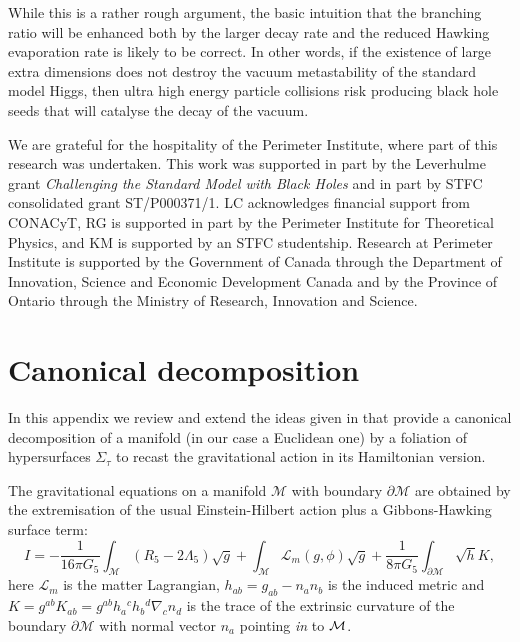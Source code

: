 \documentclass[aps,12pt,prd,superscriptaddress,preprintnumbers, 
	amssymb,
	amsmath,
	notitlepage,
	longbibliography,
	nofootinbib]{revtex4-1}
\begin{document}
While this is a rather rough argument, the basic intuition that the 
branching ratio will be enhanced both by the larger decay rate and 
the reduced Hawking evaporation rate is likely to be correct. In other
words, if the existence of large extra dimensions does not destroy the 
vacuum metastability of the standard model Higgs, then ultra high energy
particle collisions risk producing black hole seeds that will catalyse the
decay of the vacuum.


\acknowledgments

We are grateful for the hospitality of the Perimeter Institute, where part
of this research was undertaken. This work was supported in part by the 
Leverhulme grant \emph{Challenging the Standard Model with Black Holes}
and in part by STFC consolidated grant ST/P000371/1.  
LC acknowledges financial support from CONACyT,
RG is supported in part by the Perimeter Institute for Theoretical Physics,
and KM is supported by an STFC studentship.
Research at Perimeter Institute is supported by the Government of
Canada through the Department of Innovation, Science and Economic 
Development Canada and by the Province of Ontario through the
Ministry of Research, Innovation and Science.




\appendix
\section{Canonical decomposition}
\label{Appaction}

In this appendix we review and extend the ideas given in \cite{Hawking:1995fd}
that provide a canonical decomposition of a manifold (in our case a
Euclidean one) by a foliation of hypersurfaces $\Sigma_\tau$ to recast 
the gravitational action in its Hamiltonian version. 

The gravitational equations on a manifold $\mathcal{M}$ with boundary 
$\partial \mathcal{M}$ are obtained by the extremisation of the usual 
Einstein-Hilbert action plus a Gibbons-Hawking surface term:
\begin{equation}
I= - \frac{1}{16\pi G_5} \int_{\mathcal{M}}\left(R_5 - 2\Lambda_5\right)  
\sqrt{g} + \int_{\mathcal{M}} \mathcal{L}_m(g,\phi)  \sqrt{g} 
+ \frac{1}{8\pi G_5} \int_{\partial\mathcal{M} }\sqrt{h}  K,
\label{TBHaction}
\end{equation}
here $\mathcal{L}_m$ is the matter Lagrangian, $h_{ab} = g_{ab}
-n_a n_b$ is the induced metric and 
$K=g^{ab}K_{ab}=g^{ab}h_a{}^c h_b{}^d \nabla_c n_d$ 
is the trace of the extrinsic curvature of the boundary 
$\partial \mathcal{M}$ with normal vector $n_a$ pointing \emph{in}
to ${\cal M}$.
\end{document}
